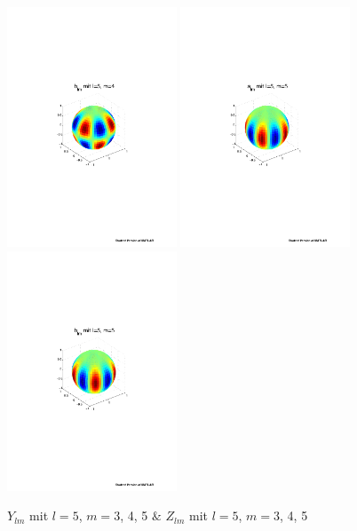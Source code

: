 \begin{refsection}
\begin{figure}
\includegraphics[width=0.45\textwidth]{kugel/ylm/b_5_4.pdf}
\includegraphics[width=0.45\textwidth]{kugel/ylm/a_5_5.pdf}
\includegraphics[width=0.45\textwidth]{kugel/ylm/b_5_5.pdf}
\caption{$Y_{lm}$ mit $l=5$, $m=3$, 4, 5 $\&$ $Z_{lm}$ mit $l=5$, $m=3$, 4, 5
\label{skript:Bild 2}}
\end{figure}


\end{refsection}
